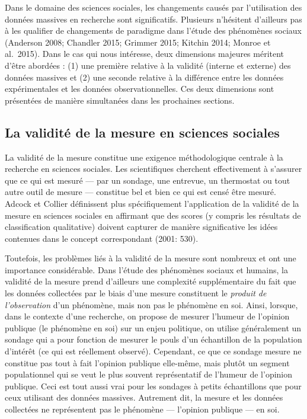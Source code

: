 \documentclass[
  letterpaper,
  DIV=11,
  numbers=noendperiod]{scrreprt}
\begin{document}

Dans le domaine des sciences sociales, les changements causés par
l'utilisation des données massives en recherche sont significatifs.
Plusieurs n'hésitent d'ailleurs pas à les qualifier de changements de
paradigme dans l'étude des phénomènes sociaux (Anderson 2008; Chandler
2015; Grimmer 2015; Kitchin 2014; Monroe et al.~2015). Dans le cas qui
nous intéresse, deux dimensions majeures méritent d'être abordées : (1)
une première relative à la validité (interne et externe) des données
massives et (2) une seconde relative à la différence entre les données
expérimentales et les données observationnelles. Ces deux dimensions
sont présentées de manière simultanées dans les prochaines sections.

\subsection*{La validité de la mesure en sciences
sociales}\label{la-validituxe9-de-la-mesure-en-sciences-sociales}

La validité de la mesure constitue une exigence méthodologique centrale
à la recherche en sciences sociales. Les scientifiques cherchent
effectivement à s'assurer que ce qui est mesuré --- par un sondage, une
entrevue, un thermostat ou tout autre outil de mesure --- constitue bel
et bien ce qui est censé être mesuré. Adcock et Collier définissent plus
spécifiquement l'application de la validité de la mesure en sciences
sociales en affirmant que des scores (y compris les résultats de
classification qualitative) doivent capturer de manière significative
les idées contenues dans le concept correspondant (2001: 530).

Toutefois, les problèmes liés à la validité de la mesure sont nombreux
et ont une importance considérable. Dans l'étude des phénomènes sociaux
et humains, la validité de la mesure prend d'ailleurs une complexité
supplémentaire du fait que les données collectées par le biais d'une
mesure constituent le \emph{produit de l'observation} d'un phénomène,
mais non pas le phénomène en soi. Ainsi, lorsque, dans le contexte d'une
recherche, on propose de mesurer l'humeur de l'opinion publique (le
phénomène en soi) sur un enjeu politique, on utilise généralement un
sondage qui a pour fonction de mesurer le pouls d'un échantillon de la
population d'intérêt (ce qui est réellement observé). Cependant, ce que
ce sondage mesure ne constitue pas tout à fait l'opinion publique
elle-même, mais plutôt un segment populationnel qui se veut le plus
souvent représentatif de l'humeur de l'opinion publique. Ceci est tout
aussi vrai pour les sondages à petits échantillons que pour ceux
utilisant des données massives. Autrement dit, la mesure et les données
collectées ne représentent pas le phénomène --- l'opinion publique ---
en soi.
\end{document}
